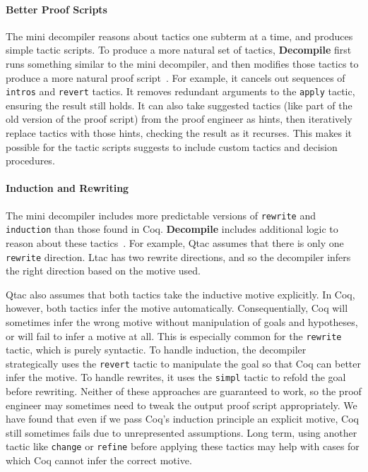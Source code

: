 \paragraph{Better Proof Scripts}
The mini decompiler reasons about tactics one subterm at a time, and produces simple tactic scripts.
To produce a more natural set of tactics, \textbf{Decompile} first runs something similar to the mini decompiler, and then modifies those tactics to produce a more natural proof script~. %
For example, it cancels out sequences of \lstinline{intros} and \lstinline{revert} tactics.
It removes redundant arguments to the \lstinline{apply} tactic, ensuring the result still holds. %
It can also take suggested tactics (like part of the old version of the proof script) from the proof engineer as hints,
then iteratively replace tactics with those hints, checking the result as it recurses.
This makes it possible for the tactic scripts \toolname suggests to include custom tactics and decision procedures.

\paragraph{Induction and Rewriting}
The mini decompiler includes more predictable versions of \lstinline{rewrite} and \lstinline{induction}
than those found in Coq. \textbf{Decompile} includes additional logic to reason about these tactics~. %
For example, Qtac assumes that there is only one \lstinline{rewrite} direction. Ltac has two rewrite directions,
and so the decompiler infers the right direction based on the motive used.

Qtac also assumes that both tactics take the inductive motive explicitly.
In Coq, however, both tactics infer the motive automatically.
Consequentially, Coq will sometimes infer the wrong motive without manipulation of goals and hypotheses,
or will fail to infer a motive at all.
This is especially common for the \lstinline{rewrite} tactic, which is purely syntactic.
To handle induction, the decompiler strategically uses the \lstinline{revert} tactic to manipulate the goal
so that Coq can better infer the motive.
To handle rewrites, it uses the \lstinline{simpl} tactic to refold the goal before rewriting.
Neither of these approaches are guaranteed to work, so the proof engineer may sometimes need to tweak the output proof script appropriately.
We have found that even if we pass Coq's induction principle an explicit motive, Coq still sometimes fails due
to unrepresented assumptions.
Long term, using another tactic like \lstinline{change} or \lstinline{refine} before applying these tactics
may help with cases for which Coq cannot infer the correct motive.

